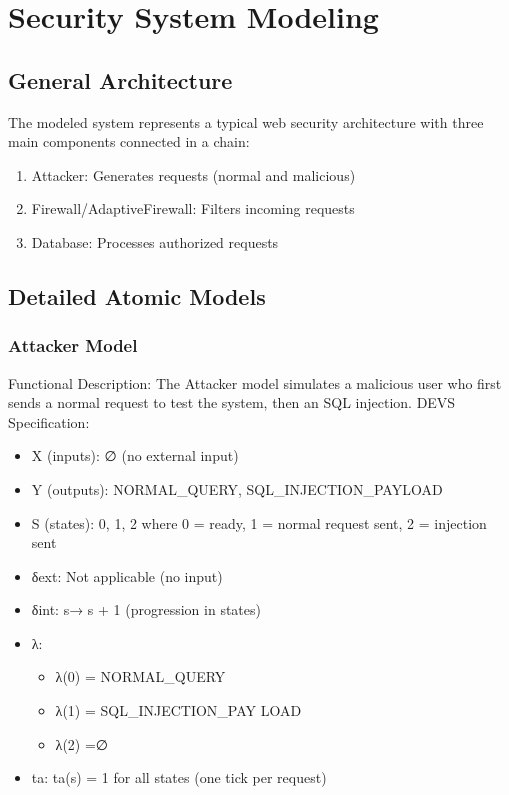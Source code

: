 \documentclass{article}
\begin{document}
\section{Security System Modeling}
\subsection{General Architecture}
The modeled system represents a typical web security architecture with three main components connected in a chain:
\begin{enumerate}
    \item Attacker: Generates requests (normal and malicious)
    \item Firewall/AdaptiveFirewall: Filters incoming requests
    \item Database: Processes authorized requests
\end{enumerate}

\subsection{Detailed Atomic Models}
\subsubsection{Attacker Model}
Functional Description: The Attacker model simulates a malicious user who first sends a normal request to test the system, then an SQL injection.
DEVS Specification:
\begin{itemize}
    \item X (inputs): ∅ (no external input)
    \item Y (outputs): {NORMAL\_QUERY, SQL\_INJECTION\_PAYLOAD}
    \item S (states): {0, 1, 2} where 0 = ready, 1 = normal request sent, 2 = injection sent
    \item δext: Not applicable (no input)
    \item δint: s→ s + 1 (progression in states)
    \item λ:
    \begin{itemize}
        \item λ(0) = NORMAL\_QUERY
        \item λ(1) = SQL\_INJECTION\_PAY LOAD
        \item λ(2) =∅
    \end{itemize}
    \item ta: ta(s) = 1 for all states (one tick per request)
\end{itemize}
\end{document}
